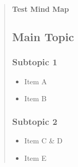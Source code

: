 \begin{quote}
\textbf{Test Mind Map}

\subsection{Main Topic}

\subsubsection{Subtopic 1}

\begin{itemize}
\item Item A
\item Item B
\end{itemize}
\subsubsection{Subtopic 2}

\begin{itemize}
\item Item C \& D
\item Item E
\end{itemize}
\end{quote}